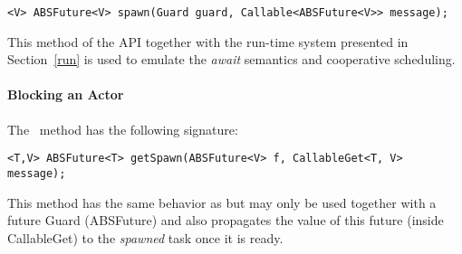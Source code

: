 \begin{lstlisting}
<V> ABSFuture<V> spawn(Guard guard, Callable<ABSFuture<V>> message);
\end{lstlisting}

This method of the API together with the run-time system presented in Section~\ref{run} is used to emulate the \textit{await} semantics and cooperative scheduling. 

\paragraph{Blocking an Actor}
The \gspawn ~method has the following signature:

\begin{lstlisting}
<T,V> ABSFuture<T> getSpawn(ABSFuture<V> f, CallableGet<T, V> message);
\end{lstlisting}

This method has the same behavior as \spawn but may only be used together with a future Guard (ABSFuture) and also propagates the value of this future (inside CallableGet) to the \textit{spawned} task once it is ready.  

